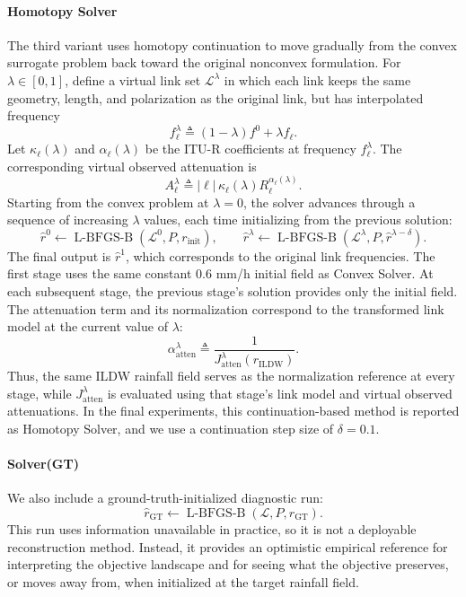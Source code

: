\documentclass[11pt]{article}
\begin{document}
\paragraph*{Homotopy Solver}
The third variant uses homotopy continuation \citep{allgower2003continuation} to move gradually from the convex surrogate problem back toward the original nonconvex formulation. For $\lambda\in[0,1]$, define a virtual link set $\mathcal{L}^{\lambda}$ in which each link keeps the same geometry, length, and polarization as the original link, but has interpolated frequency
\[
f_\ell^\lambda \triangleq (1-\lambda)f^0+\lambda f_\ell.
\]
Let $\kappa_\ell(\lambda)$ and $\alpha_\ell(\lambda)$ be the ITU-R coefficients at frequency $f_\ell^\lambda$. The corresponding virtual observed attenuation is
\[
A_\ell^\lambda \triangleq
|\ell|\,\kappa_\ell(\lambda) R_\ell^{\alpha_\ell(\lambda)}.
\]
Starting from the convex problem at $\lambda=0$, the solver advances through a sequence of increasing $\lambda$ values, each time initializing from the previous solution:
\[
\hat r^0 \leftarrow
\operatorname{L\mbox{-}BFGS\mbox{-}B}(\mathcal{L}^0,P,r_{\mathrm{init}}),
\qquad
\hat r^\lambda \leftarrow
\operatorname{L\mbox{-}BFGS\mbox{-}B}(\mathcal{L}^{\lambda},P,\hat r^{\lambda-\delta}).
\]
The final output is $\hat r^1$, which corresponds to the original link frequencies. {\color{black}The first stage uses the same constant $0.6$ mm/h initial field as Convex Solver. At each subsequent stage, the previous stage's solution provides only the initial field. The attenuation term and its normalization correspond to the transformed link model at the current value of $\lambda$:
\[
\alpha_{\mathrm{atten}}^\lambda
\triangleq
\frac{1}{J_{\mathrm{atten}}^\lambda(r_{\mathrm{ILDW}})}.
\]
Thus, the same ILDW rainfall field serves as the normalization reference at every stage, while $J_{\mathrm{atten}}^\lambda$ is evaluated using that stage's link model and virtual observed attenuations.} In the final experiments, this continuation-based method is reported as Homotopy Solver, and we use a continuation step size of $\delta=0.1$.

\paragraph*{Solver(GT)}
We also include a ground-truth-initialized diagnostic run:
\[
\hat r_{\mathrm{GT}} \leftarrow
\operatorname{L\mbox{-}BFGS\mbox{-}B}(\mathcal{L},P,r_{\mathrm{GT}}).
\]
This run uses information unavailable in practice, so it is not a deployable reconstruction method. Instead, it provides an optimistic empirical reference for interpreting the objective landscape and for seeing what the objective preserves, or moves away from, when initialized at the target rainfall field.
\end{document}
